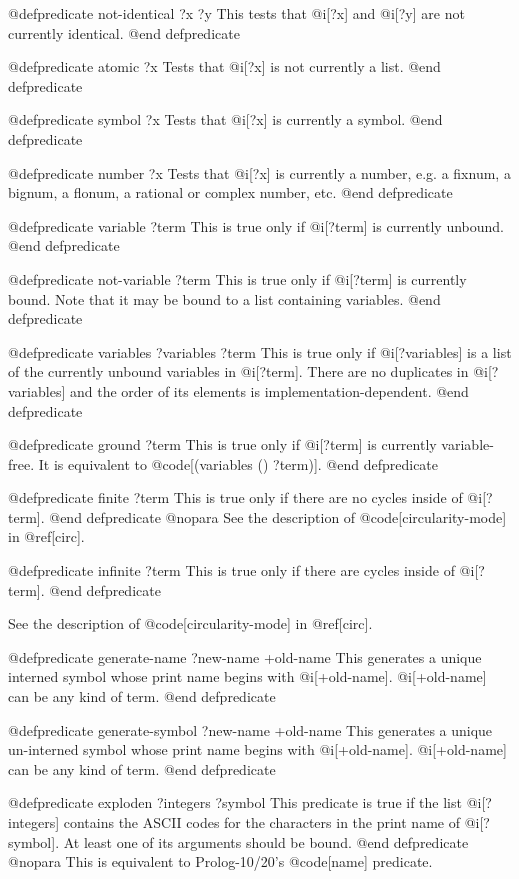 {@defpredicate not-identical ?x ?y
This tests that @i[?x] and @i[?y] are not currently identical.
@end defpredicate


@defpredicate atomic ?x
Tests that @i[?x] is not currently a list.
@end defpredicate

@defpredicate symbol ?x
Tests that @i[?x] is currently a symbol.
@end defpredicate

@defpredicate number ?x
Tests that @i[?x] is currently a number, e.g. a fixnum, a bignum, a flonum,
a rational or complex number, etc.
@end defpredicate


@defpredicate variable ?term
This is true only if @i[?term] is currently unbound.
@end defpredicate


@defpredicate not-variable ?term
This is true only if @i[?term] is currently bound.
Note that it may be bound to a list containing variables.
@end defpredicate


@defpredicate variables ?variables ?term
This is true only if @i[?variables]
is a list of the currently unbound variables in @i[?term].
There are no duplicates in @i[?variables]
and the order of its elements is implementation-dependent.
@end defpredicate

@defpredicate ground ?term
This is true only if @i[?term] is currently variable-free.
It is equivalent to @code[(variables () ?term)].
@end defpredicate


@defpredicate finite ?term
This is true only if there are no cycles inside of @i[?term].
@end defpredicate
@nopara
See the description of @code[circularity-mode] in @ref[circ].

@defpredicate infinite ?term
This is true only if there are cycles inside of @i[?term].
@end defpredicate

See the description of @code[circularity-mode] in @ref[circ].

@defpredicate generate-name ?new-name +old-name
This generates a unique interned symbol whose print name begins with
@i[+old-name].
@i[+old-name] can be any kind of term.
@end defpredicate


@defpredicate generate-symbol ?new-name +old-name
This generates a unique un-interned symbol whose print name begins with
@i[+old-name].
@i[+old-name] can be any kind of term.
@end defpredicate

@defpredicate exploden ?integers ?symbol
This predicate is true if the list @i[?integers] contains the ASCII
codes for the characters in the print name of @i[?symbol].
At least one of its arguments should be bound.
@end defpredicate
@nopara
This is equivalent to Prolog-10/20's @code[name] predicate.


}
